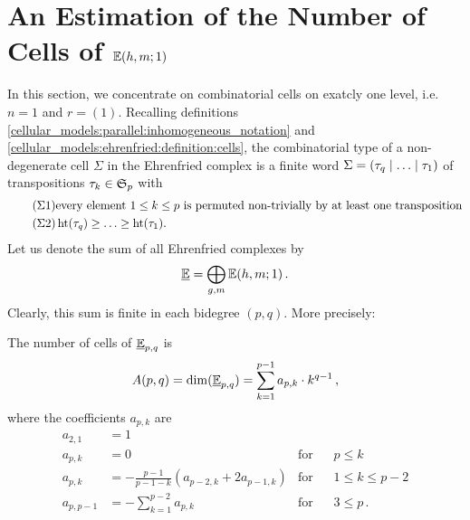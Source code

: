 \section{An Estimation of the Number of Cells of \texorpdfstring{$\E(h,m;1)$}{E(h,m;1)}}
\label{complexity:number_of_mono_cells}
In this section, we concentrate on combinatorial cells on exatcly one level, i.e.\ $n = 1$ and $r = (1)$.
Recalling definitions \ref{cellular_models:parallel:inhomogeneous_notation} and \ref{cellular_models:ehrenfried:definition:cells},
the combinatorial type of a non-degenerate cell $\Sigma$ in the Ehrenfried complex is a finite word $\Sigma = \inhomq$ of transpositions $\tau_k \in \Symgrp_p$ with
\begin{align}
    \label{CharCellPerm} \tag{$\Sigma1$} & \text{every element $1 \le k \le p$ is permuted non-trivially by at least one transposition} \\
    \label{CharCellMono} \tag{$\Sigma2$} & \hgt(\tau_q) \ge \ldots \ge \hgt(\tau_1).
\end{align}
Let us denote the sum of all Ehrenfried complexes by
\[
    \ul\E = \bigoplus_{g,m} \Ehrr[1] \,.
\]
Clearly, this sum is finite in each bidegree $(p,q)$.
More precisely:
\begin{prop}
    \label{prop:number_of_mono_cells}
    The number of cells of $\ul\E_{p,q}$ is
    \begin{align}
        \label{Char_A_p_q} A(p,q) = \dim (\ul\E_{p,q}) = \sum_{k=1}^{p-1} a_{p,k} \cdot k^{q-1} \,,
    \end{align}
    where the coefficients $a_{p,k}$ are
    \begin{align}
        \label{Char_2_1} a_{2,1}         &= 1 \\
        \label{Char_p_leq_k}     a_{p,k} &= 0                                                    & \text{for} & \hspace{10pt} p \le k \\
        \label{Char_k_leq_p_2}   a_{p,k} &= -\frac{p-1}{p-1-k} ( a_{p-2,k} + 2a_{p-1,k} )        & \text{for} & \hspace{10pt} 1 \le k \le p-2 \\
        \label{Char_p_geq_3}   a_{p,p-1} &= - \sum_{k=1}^{p-2} a_{p,k}                           & \text{for} & \hspace{10pt} 3 \le p \,.
    \end{align}
\end{prop}

